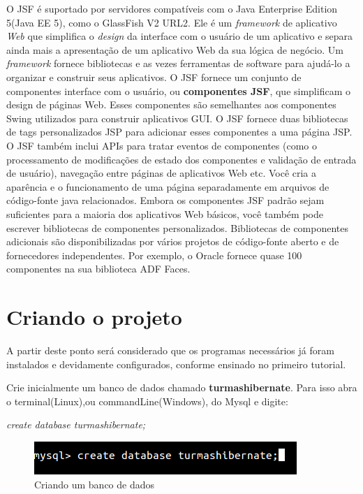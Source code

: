 \documentclass[12pt,a4paper]{article}
\begin{document}
O JSF é suportado por servidores compatíveis com o Java Enterprise Edition 5(Java EE 5), como o GlassFish V2 URL2. Ele é um \textit{framework} de aplicativo \textit{Web} que simplifica o \textit{design} da interface com o usuário de um aplicativo e separa ainda mais a apresentação de um aplicativo Web da sua lógica de negócio. Um \textit{framework} fornece bibliotecas e as vezes ferramentas de software para ajudá-lo a organizar e construir seus aplicativos. O JSF fornece um conjunto de componentes interface com o usuário, ou \textbf{componentes JSF}, que simplificam o design de páginas Web. Esses componentes são semelhantes aos componentes Swing utilizados para construir aplicativos GUI. O JSF fornece duas bibliotecas de tags personalizados JSP para adicionar esses componentes a uma página JSP. \\

O JSF também inclui APIs para tratar eventos de componentes (como o processamento de modificações de estado dos componentes e validação de entrada de usuário), navegação entre páginas de aplicativos Web etc. Você cria a aparência e o funcionamento de uma página separadamente em arquivos de código-fonte java relacionados.
Embora os componentes JSF padrão sejam suficientes para a maioria dos aplicativos Web básicos, você também pode escrever bibliotecas de componentes personalizados. Bibliotecas de componentes adicionais são disponibilizadas por vários projetos de código-fonte aberto e de fornecedores independentes. Por exemplo, o Oracle fornece quase 100 componentes na sua biblioteca ADF Faces. 
\newpage
\section{Criando o projeto}

A partir deste ponto será considerado que os programas necessários já foram instalados e devidamente configurados, conforme ensinado no primeiro tutorial.

Crie inicialmente um banco de dados chamado \textbf{turmashibernate}. Para isso abra o terminal(Linux),ou commandLine(Windows), do Mysql e digite:\\
 

\begin{center}
\textit{create database turmashibernate;}
\end{center}




\begin{figure}[!htb]
    \centering
    \includegraphics[scale=0.60]{CriandoBancoDeDados.png}
    \caption{Criando um banco de dados}
    \label{imagemCriandoBancodeDados}
\end{figure}
\end{document}
